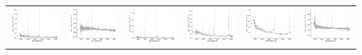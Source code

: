 \begin{center}
\begin{longtable}{l l l l l l }
    \includegraphics[width=0.3\linewidth, clip]{Figs/Figs-sdss/spec-0707-52177-0374-STRIPE82-0060-019709.pdf} & \includegraphics[width=0.3\linewidth, clip]{Figs/Figs-sdss/spec-0914-52721-0103-SPLUS-n03s44-026823.pdf} & \includegraphics[width=0.3\linewidth, clip]{Figs/Figs-sdss/spec-0914-52721-0431-SPLUS-n03s43-048919.pdf} & \includegraphics[width=0.3\linewidth, clip]{Figs/Figs-sdss/spec-0981-52435-0575-STRIPE82-0102-040352.pdf} & \includegraphics[width=0.3\linewidth, clip]{Figs/Figs-sdss/spec-0982-52466-0091-STRIPE82-0103-087316.pdf} & \includegraphics[width=0.3\linewidth, clip]{Figs/Figs-sdss/spec-0982-52466-0477-STRIPE82-0103-089600.pdf} \\

\end{longtable}
\end{center}
